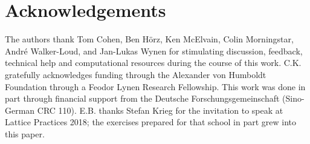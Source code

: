 \section*{Acknowledgements}\label{sec:acknowledgements}

The authors thank
Tom Cohen,
Ben H\"{o}rz,
Ken McElvain,
Colin Morningstar,
Andr\'{e} Walker-Loud,
and
Jan-Lukas Wynen
for stimulating discussion, feedback, technical help and computational resources during the course of this work.
C.K. gratefully acknowledges funding through the Alexander von Humboldt Foundation through a Feodor Lynen Research Fellowship.
This work was done in part through financial support from the Deutsche Forschungsgemeinschaft (Sino-German CRC 110).
E.B. thanks Stefan Krieg for the invitation to speak at Lattice Practices 2018\cite{lattice-practices}; the exercises\cite{lattice-practices-exercises} prepared for that school in part grew into this paper.
